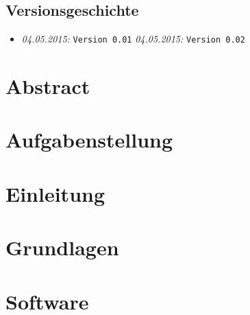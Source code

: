 \documentclass{fhnwreport/fhnwreport}
\begin{document}


\tableofcontents
\vspace{80mm}
\subsection*{Versionsgeschichte}
\begin{itemize}
    \item[]
        \emph{04.05.2015:} \texttt{Version 0.01}
        \emph{04.05.2015:} \texttt{Version 0.02}
\end{itemize}
\clearpage

\section*{Abstract}
\label{sec:abstract}



\section*{Aufgabenstellung}
\label{sec:aufgabenstellung}



\section*{Einleitung}
\label{sec:einleitung}



\section*{Grundlagen}
\label{sec:grundlagen}



\section*{Software}
\label{sec:software}

\end{document}
